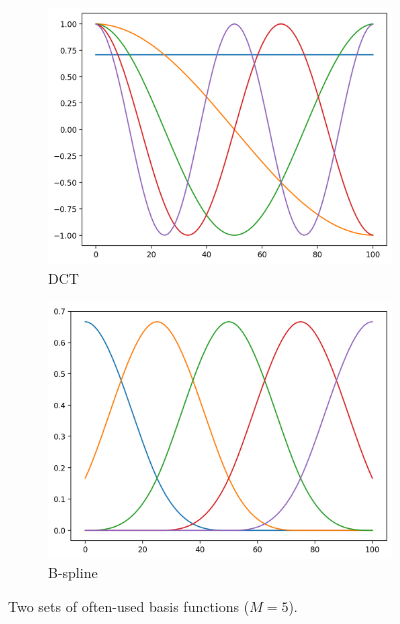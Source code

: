 \documentclass[10pt,twoside]{book}
\begin{document}
\begin{figure}
  \centering
  \begin{subfigure}{0.45\textwidth}
     \includegraphics[width=\textwidth]{basisFunctions_type0}
     \caption{DCT}
     \label{fig:basisFunctions1D_DCT}
  \end{subfigure}
  \hfill
  \begin{subfigure}{0.45\textwidth}
     \includegraphics[width=\textwidth]{basisFunctions_type1}
     \caption{B-spline}
     \label{fig:basisFunctions1D_BSpline}
  \end{subfigure}
  \caption{Two sets of often-used basis functions ($M=5$).}
\end{figure}
\end{document}
